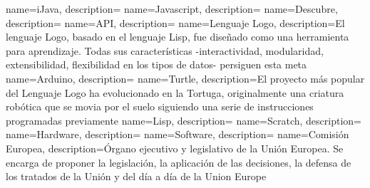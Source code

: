 
%





{
        name=iJava,
        description={}
}
{
        name=Javascript,
        description={}
}
{
        name=Descubre,
        description={}
}
{
        name=API,
        description={}
}
{
        name=Lenguaje Logo,
        description={El lenguaje Logo, basado en el lenguaje Lisp, fue diseñado como una herramienta para aprendizaje. Todas sus características -interactividad, modularidad, extensibilidad, flexibilidad en los tipos de datos- persiguen esta meta}
}
{
        name=Arduino,
        description={}
}
{
        name=Turtle,
        description={El proyecto más popular del Lenguaje Logo ha evolucionado en la Tortuga, originalmente una criatura robótica que se movia por el suelo siguiendo una serie de instrucciones programadas previamente}
}
{
        name=Lisp,
        description={}
}
{
        name=Scratch,
        description={}
}
{
        name=Hardware,
        description={}
}
{
        name=Software,
        description={}
}
{
        name=Comisión Europea,
        description={Órgano ejecutivo y legislativo de la Unión Europea. Se encarga de proponer la legislación, la aplicación de las decisiones, la defensa de los tratados de la Unión y del día a día de la Union Europe}
}

